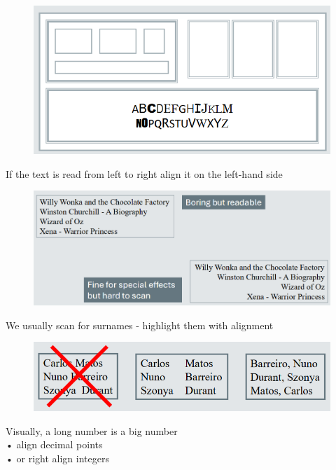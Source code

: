 \documentclass[]{project_plan}
\begin{document}
\begin{figure}[ht!]
  \includegraphics[width=40em]{graphic_design_decoration.png}
\end{figure}

If the text is read from left to right align it on the left-hand side

\begin{figure}[ht!]
  \includegraphics[width=40em]{graphic_design_text_alignment.png}
\end{figure}

We usually scan for surnames - highlight them with alignment

\begin{figure}[ht!]
  \includegraphics[width=40em]{graphic_design_surname_alignment.png}
\end{figure}

Visually, a long number is a big number\\
• align decimal points\\
• or right align integers
\end{document}
